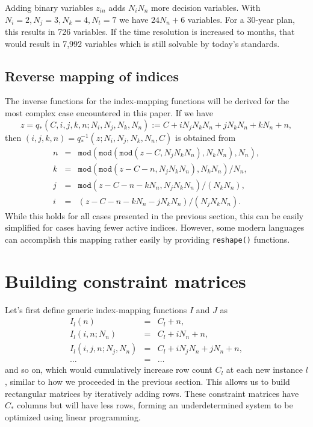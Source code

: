 \documentclass{report}[fleqn,12pt]
\begin{document}
Adding binary variables $z_{in}$ adds $N_iN_n$ more decision variables.
With $N_i = 2, N_j = 3, N_k = 4, N_t = 7$ we have $24 N_n + 6$ variables. For
a 30-year plan, this results in 726 variables. If the time resolution is increased to
months, that would result in 7,992 variables which is still solvable by today's standards.

\section{Reverse mapping of indices}
The inverse functions for the index-mapping functions will be derived for the
most complex case encountered in this paper.
If we have
\begin{equation}
	z = q_*(C, i, j, k, n; N_i, N_j, N_k, N_n) := C + iN_jN_kN_n + jN_kN_n + kN_n + n,
\end{equation}
then $(i, j, k, n) = q_*^{-1}(z; N_i, N_j, N_k, N_n, C)$ is obtained from
\begin{eqnarray}
	n &=& \texttt{mod}(\texttt{mod}(\texttt{mod}(z - C, N_jN_kN_n), N_kN_n), N_n), \nonumber \\
	k &=& \texttt{mod}(\texttt{mod}(z - C - n, N_jN_kN_n), N_kN_n)/N_n, \nonumber \\
	j &=& \texttt{mod}(z - C - n - kN_n, N_jN_kN_n)/(N_kN_n), \nonumber \\
	i &=& (z - C - n - kN_n - jN_kN_n)/(N_jN_kN_n).
\end{eqnarray}
While this holds for all cases presented in the previous section, this can be easily simplified
for cases having fewer active indices. However, some modern languages can accomplish this
mapping rather easily by providing \texttt{reshape()} functions.

\chapter{Building constraint matrices}
Let's first define generic index-mapping functions $I$ and $J$ as
\begin{eqnarray}
	\label{Eq:Offsets}
	I_l(n) &=& C_l + n, \nonumber \\
	I_l(i, n; N_n) &=& C_l + iN_n + n, \nonumber \\
	I_l(i, j, n; N_j, N_n) &=& C_l + iN_j N_n + jN_n +n, \\
	\ldots &=& \ldots \nonumber
\end{eqnarray}
and so on, which would cumulatively increase row count $C_l$ at each new instance $l$,
similar to how we proceeded in the previous section.
This allows us to build rectangular matrices by iteratively adding rows.
These constraint matrices have $C_*$
columns but will have less rows,
forming an underdetermined system to be optimized using linear programming.
\end{document}
